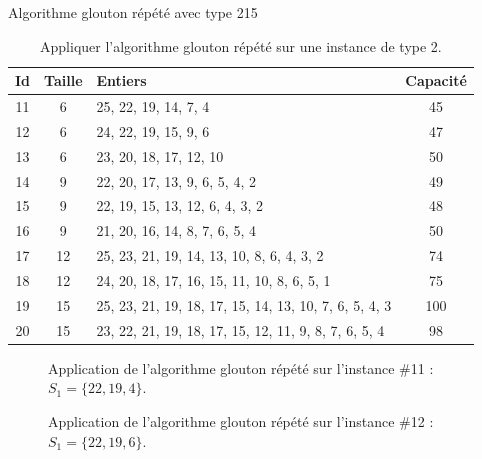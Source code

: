 \begin{exercice}[label=ex:MTGS2]{Algorithme glouton répété avec type 2}{15}

\begin{table}[H]
\centering
\begin{tabular}{cclc}
  \toprule
Id & Taille & Entiers & Capacité \\
  \midrule
 11 &   6 & 25, 22, 19, 14, 7, 4 &  45 \\
   12 &   6 & 24, 22, 19, 15, 9, 6 &  47 \\
   13 &   6 & 23, 20, 18, 17, 12, 10 &  50 \\
   14 &   9 & 22, 20, 17, 13, 9, 6, 5, 4, 2 &  49 \\
   15 &   9 & 22, 19, 15, 13, 12, 6, 4, 3, 2 &  48 \\
   16 &   9 & 21, 20, 16, 14, 8, 7, 6, 5, 4 &  50 \\
   17 &  12 & 25, 23, 21, 19, 14, 13, 10, 8, 6, 4, 3, 2 &  74 \\
   18 &  12 & 24, 20, 18, 17, 16, 15, 11, 10, 8, 6, 5, 1 &  75 \\
   19 &  15 & 25, 23, 21, 19, 18, 17, 15, 14, 13, 10, 7, 6, 5, 4, 3 & 100 \\
   20 &  15 & 23, 22, 21, 19, 18, 17, 15, 12, 11, 9, 8, 7, 6, 5, 4 &  98 \\
   \bottomrule
\end{tabular}
\caption{Appliquer l'algorithme glouton répété sur une instance de type 2.}
\label{tab:MTGS2}
\end{table}

\end{exercice}

\begin{figure}[htbp]
\centering
{}
\caption{Application de l'algorithme glouton répété sur l'instance \#11 : $S_1 = \{22,19,4\}$.}
\label{fig:MTGS2-11}
\end{figure}

\ifshowsols

\begin{figure}[htbp]
\centering
{}
\caption{Application de l'algorithme glouton répété sur l'instance \#12 : $S_1 = \{22,19,6\}$.}
\label{fig:MTGS2-12}
\end{figure}

